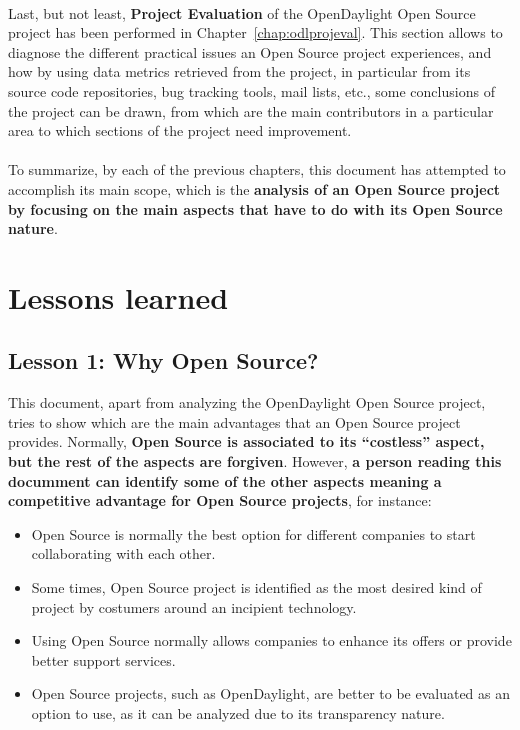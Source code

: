 \documentclass[a4paper, 12pt]{book}
\begin{document}
\\
Last, but not least, \textbf{Project Evaluation} of the OpenDaylight Open Source project has been performed in Chapter~\ref{chap:odlprojeval}. This section allows to diagnose the different practical issues an Open Source project experiences, and how by using data metrics retrieved from the project, in particular from its source code repositories, bug tracking tools, mail lists, etc., some conclusions of the project can be drawn, from which are the main contributors in a particular area to which sections of the project need improvement.\\
\\
To summarize, by each of the previous chapters, this document has attempted to accomplish its main scope, which is the \textbf{analysis of an Open Source project by focusing on the main aspects that have to do with its Open Source nature}.

\section{Lessons learned}
\label{sec:lessons}

\subsection{Lesson 1: Why Open Source?}
This document, apart from analyzing the OpenDaylight Open Source project, tries to show which are the main advantages that an Open Source project provides. Normally, \textbf{Open Source is associated to its ``costless'' aspect, but the rest of the aspects are forgiven}. However, \textbf{a person reading this documment can identify some of the other aspects meaning a competitive advantage for Open Source projects}, for instance:
\begin{itemize}
 \item{Open Source is normally the best option for different companies to start collaborating with each other}.
 \item{Some times, Open Source project is identified as the most desired kind of project by costumers around an incipient technology}.
 \item{Using Open Source normally allows companies to enhance its offers or provide better support services}.
 \item{Open Source projects, such as OpenDaylight, are better to be evaluated as an option to use, as it can be analyzed due to its transparency nature}.
\end{itemize}
\end{document}
